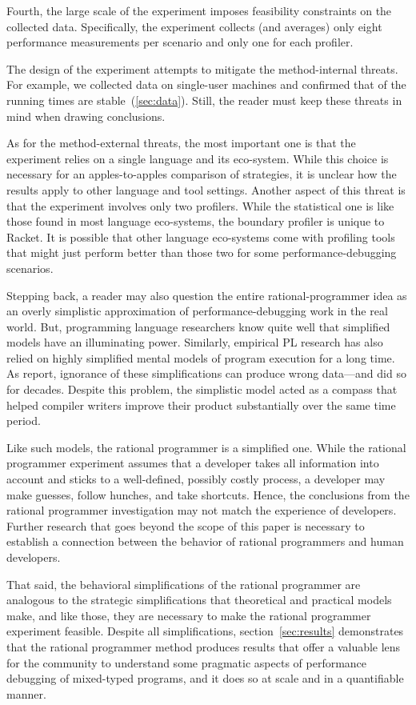 Fourth, the large scale of the experiment imposes
feasibility constraints on the collected data. Specifically, the experiment 
collects (and averages) only eight performance measurements per scenario
and only one for each profiler.

The design of the experiment attempts to mitigate the
method-internal threats. For example, we collected data on
single-user machines and confirmed that  of the running
times are stable~(\cref{sec:data}).
Still, the reader must keep these threats in mind when drawing conclusions.

As for the method-external threats, the most important one is that the experiment
relies on a single language and its eco-system. While this choice is necessary for
an apples-to-apples comparison of strategies, it is unclear how the results apply
to other language and tool settings. Another aspect of this threat is that the
experiment involves only two profilers. While the statistical one is like those
found in most language eco-systems, the boundary profiler is unique to Racket. It
is possible that other language eco-systems come with profiling tools that might
just perform better than those two for some performance-debugging scenarios.

Stepping back, a reader may also question the entire rational-programmer idea as
an overly simplistic approximation of performance-debugging work in the real
world. But, programming language researchers know quite well that simplified
models have an illuminating power.  Similarly, empirical PL research has also
relied on highly simplified mental models of program execution for a long
time. As \citet{mdhs:wrong-data} report, ignorance of these simplifications can
produce wrong data---and did so for decades. Despite this problem, the simplistic
model acted as a compass that helped compiler writers improve their product
substantially over the same time period.

Like such models, the rational programmer is a simplified one.  While the
rational programmer experiment assumes that a developer takes all
information into account and sticks to a well-defined, possibly costly
process, a developer may make guesses, follow hunches, and take
shortcuts. Hence, the conclusions from the rational programmer
investigation may not match the experience of developers. Further
research that goes beyond the scope of this paper is necessary to
establish a connection between the behavior of rational programmers
and human developers.  

That said, the behavioral simplifications of the rational programmer are
analogous to the strategic simplifications that theoretical and practical models
make, and like those, they are necessary to make the rational programmer
experiment feasible. Despite all simplifications, section~\ref{sec:results}
demonstrates that the rational programmer method produces results that offer a
valuable lens for the community to understand some pragmatic aspects of
performance debugging of mixed-typed programs, and it does so at scale and in a
quantifiable manner.
